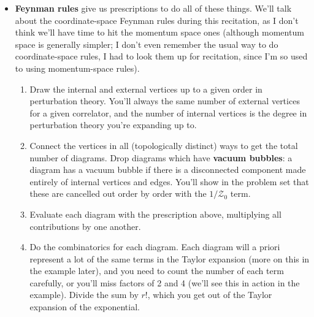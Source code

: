 \documentclass[12pt, oneside]{article}   	%
\theoremstyle{definition}
\begin{document}
\begin{itemize}
	\item \textbf{Feynman rules} give us prescriptions to do all of these things. We'll talk about the coordinate-space Feynman rules during this recitation, as I don't think we'll have time to hit the momentum space ones (although momentum space is generally simpler; I don't even remember the usual way to do coordinate-space rules, I had to look them up for recitation, since I'm so used to using momentum-space rules). 
	\begin{enumerate}
		\item Draw the internal and external vertices up to a given order in perturbation theory. You'll always the same number of external vertices for a given correlator, and the number of internal vertices is the degree in perturbation theory you're expanding up to. 
		\item Connect the vertices in all (topologically distinct) ways to get the total number of diagrams. Drop diagrams which have \textbf{vacuum bubbles}: a diagram has a vacuum bubble if there is a disconnected component made entirely of internal vertices and edges. You'll show in the problem set that these are cancelled out order by order with the $1 / \mathcal Z_0$ term. 
		\item Evaluate each diagram with the prescription above, multiplying all contributions by one another. 
		\item Do the combinatorics for each diagram. Each diagram will a priori represent a lot of the same terms in the Taylor expansion (more on this in the example later), and you need to count the number of each term carefully, or you'll miss factors of 2 and 4 (we'll see this in action in the example). Divide the sum by $r!$, which you get out of the Taylor expansion of the exponential. 
	\end{enumerate}
	

\end{itemize}
\end{document}
